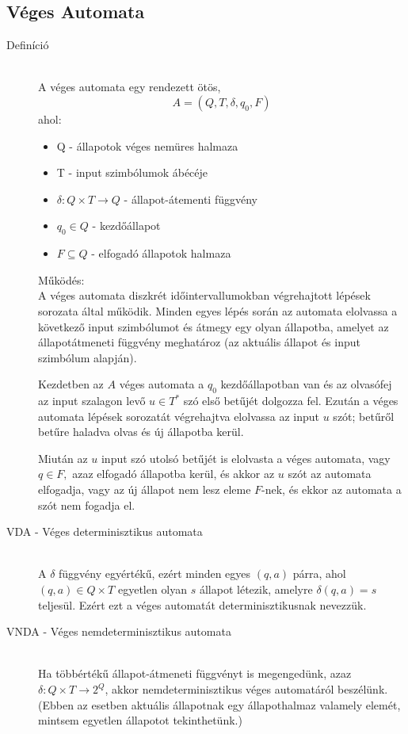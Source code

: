 \documentclass[margin=0px]{article}
\begin{document}
		\subsection{Véges Automata}
			\begin{description}
				\item[Definíció] \hfill \\
					A véges automata egy rendezett ötös,
					\[A=(Q,T,\delta,q_0, F)\]
					ahol:
					\begin{itemize}
						\item Q - állapotok véges nemüres halmaza
						\item T - input szimbólumok ábécéje
						\item $\delta : Q \times T \rightarrow Q$ - állapot-átementi függvény
						\item $q_0 \in Q$ - kezdőállapot
						\item $F \subseteq Q$ - elfogadó állapotok halmaza
					\end{itemize}
					
					Működés:\\
					A véges automata diszkrét időintervallumokban végrehajtott lépések sorozata által működik. Minden egyes lépés során az automata elolvassa a következő input szimbólumot és átmegy egy olyan állapotba, amelyet az állapotátmeneti függvény meghatároz (az aktuális állapot és input szimbólum alapján).
					
					Kezdetben az $A$ véges automata a $q_0$ kezdőállapotban van és az olvasófej az input szalagon levő $u \in T^*$ szó első betűjét dolgozza fel. Ezután a véges automata lépések sorozatát végrehajtva elolvassa az input $u$ szót; betűről betűre haladva olvas és új állapotba kerül.
					
					Miután az $u$ input szó utolsó betűjét is elolvasta a véges automata, vagy $q \in F,$ azaz elfogadó állapotba kerül, és akkor az $u$ szót az automata elfogadja, vagy az új állapot nem lesz eleme $F$-nek, és ekkor az automata a szót nem fogadja el.
					

				\item[VDA - Véges determinisztikus automata] \hfill \\
					A $\delta$ függvény egyértékű, ezért minden egyes $(q, a)$ párra, ahol $(q, a) \in Q \times T$ egyetlen olyan $s$ állapot létezik, amelyre $\delta(q, a) = s$ teljesül. Ezért ezt a véges automatát determinisztikusnak nevezzük.
				\item[VNDA - Véges nemdeterminisztikus automata] \hfill \\
					Ha többértékű állapot-átmeneti függvényt is megengedünk, azaz $\delta : Q \times T \rightarrow 2^Q$, akkor nemdeterminisztikus véges automatáról beszélünk. (Ebben az esetben aktuális állapotnak egy állapothalmaz valamely elemét, mintsem egyetlen állapotot tekinthetünk.)
					

\end{description}
\end{document}
